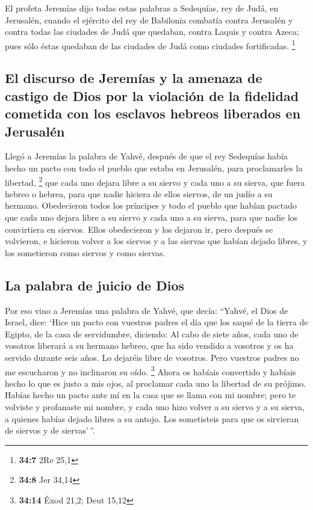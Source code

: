  El profeta Jeremías dijo todas estas palabras a
Sedequías, rey de Judá, en Jerusalén,  cuando el ejército
del rey de Babilonia combatía contra Jerusalén y contra todas las
ciudades de Judá que quedaban, contra Laquis y contra Azeca; pues sólo
éstas quedaban de las ciudades de Judá como ciudades fortificadas.
\footnote{\textbf{34:7} 2Re 25,1}

\hypertarget{el-discurso-de-jeremuxedas-y-la-amenaza-de-castigo-de-dios-por-la-violaciuxf3n-de-la-fidelidad-cometida-con-los-esclavos-hebreos-liberados-en-jerusaluxe9n}{%
\subsection{El discurso de Jeremías y la amenaza de castigo de Dios por
la violación de la fidelidad cometida con los esclavos hebreos liberados
en
Jerusalén}\label{el-discurso-de-jeremuxedas-y-la-amenaza-de-castigo-de-dios-por-la-violaciuxf3n-de-la-fidelidad-cometida-con-los-esclavos-hebreos-liberados-en-jerusaluxe9n}}

 Llegó a Jeremías la palabra de Yahvé, después de que el
rey Sedequías había hecho un pacto con todo el pueblo que estaba en
Jerusalén, para proclamarles la libertad, \footnote{\textbf{34:8} Jer
  34,14}  que cada uno dejara libre a su siervo y cada uno
a su sierva, que fuera hebreo o hebrea, para que nadie hiciera de ellos
siervos, de un judío a su hermano.  Obedecieron todos los
príncipes y todo el pueblo que habían pactado que cada uno dejara libre
a su siervo y cada uno a su sierva, para que nadie los convirtiera en
siervos. Ellos obedecieron y los dejaron ir,  pero
después se volvieron, e hicieron volver a los siervos y a las siervas
que habían dejado libres, y los sometieron como siervos y como siervas.

\hypertarget{la-palabra-de-juicio-de-dios}{%
\subsection{La palabra de juicio de
Dios}\label{la-palabra-de-juicio-de-dios}}

 Por eso vino a Jeremías una palabra de Yahvé, que decía:
 ``Yahvé, el Dios de Israel, dice: `Hice un pacto con
vuestros padres el día que los saqué de la tierra de Egipto, de la casa
de servidumbre, diciendo:  Al cabo de siete años, cada
uno de vosotros liberará a su hermano hebreo, que ha sido vendido a
vosotros y os ha servido durante seis años. Lo dejaréis libre de
vosotros. Pero vuestros padres no me escucharon y no inclinaron su oído.
\footnote{\textbf{34:14} Éxod 21,2; Deut 15,12}  Ahora os
habíais convertido y habíais hecho lo que es justo a mis ojos, al
proclamar cada uno la libertad de su prójimo. Habías hecho un pacto ante
mí en la casa que se llama con mi nombre;  pero te
volviste y profanaste mi nombre, y cada uno hizo volver a su siervo y a
su sierva, a quienes habías dejado libres a su antojo. Los sometisteis
para que os sirvieran de siervos y de siervas'\,''.

